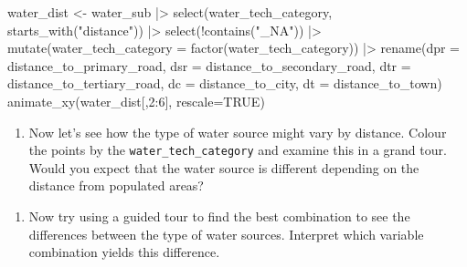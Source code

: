 \documentclass[
  letterpaper,
]{krantz}
\newenvironment{Shaded}{\begin{snugshade}}{\end{snugshade}}
\newcommand{\AttributeTok}[1]{\textcolor[rgb]{0.40,0.45,0.13}{#1}}
\newcommand{\ConstantTok}[1]{\textcolor[rgb]{0.56,0.35,0.01}{#1}}
\newcommand{\DecValTok}[1]{\textcolor[rgb]{0.68,0.00,0.00}{#1}}
\newcommand{\FunctionTok}[1]{\textcolor[rgb]{0.28,0.35,0.67}{#1}}
\newcommand{\NormalTok}[1]{\textcolor[rgb]{0.00,0.23,0.31}{#1}}
\newcommand{\OtherTok}[1]{\textcolor[rgb]{0.00,0.23,0.31}{#1}}
\newcommand{\SpecialCharTok}[1]{\textcolor[rgb]{0.37,0.37,0.37}{#1}}
\newcommand{\StringTok}[1]{\textcolor[rgb]{0.13,0.47,0.30}{#1}}
\providecommand{\tightlist}{%
  \setlength{\itemsep}{0pt}\setlength{\parskip}{0pt}}\usepackage{longtable,booktabs,array}
\begin{document}
\begin{Shaded}
\begin{Highlighting}[]
\NormalTok{water\_dist }\OtherTok{\textless{}{-}}\NormalTok{ water\_sub }\SpecialCharTok{|\textgreater{}}
  \FunctionTok{select}\NormalTok{(water\_tech\_category, }\FunctionTok{starts\_with}\NormalTok{(}\StringTok{"distance"}\NormalTok{)) }\SpecialCharTok{|\textgreater{}}
  \FunctionTok{select}\NormalTok{(}\SpecialCharTok{!}\FunctionTok{contains}\NormalTok{(}\StringTok{"\_NA"}\NormalTok{)) }\SpecialCharTok{|\textgreater{}}
  \FunctionTok{mutate}\NormalTok{(}\AttributeTok{water\_tech\_category =} \FunctionTok{factor}\NormalTok{(water\_tech\_category)) }\SpecialCharTok{|\textgreater{}}
  \FunctionTok{rename}\NormalTok{(}\AttributeTok{dpr =}\NormalTok{ distance\_to\_primary\_road,}
         \AttributeTok{dsr =}\NormalTok{ distance\_to\_secondary\_road,}
         \AttributeTok{dtr =}\NormalTok{ distance\_to\_tertiary\_road,}
         \AttributeTok{dc =}\NormalTok{ distance\_to\_city,}
         \AttributeTok{dt =}\NormalTok{ distance\_to\_town)}
\FunctionTok{animate\_xy}\NormalTok{(water\_dist[,}\DecValTok{2}\SpecialCharTok{:}\DecValTok{6}\NormalTok{], }\AttributeTok{rescale=}\ConstantTok{TRUE}\NormalTok{)}
\end{Highlighting}
\end{Shaded}

\begin{enumerate}
\def\labelenumi{\arabic{enumi}.}
\setcounter{enumi}{2}
\tightlist
\item
  Now let's see how the type of water source might vary by distance.
  Colour the points by the \texttt{water\_tech\_category} and examine
  this in a grand tour. Would you expect that the water source is
  different depending on the distance from populated areas?
\end{enumerate}

\begin{Shaded}
\end{Shaded}

\begin{enumerate}
\def\labelenumi{\arabic{enumi}.}
\setcounter{enumi}{3}
\tightlist
\item
  Now try using a guided tour to find the best combination to see the
  differences between the type of water sources. Interpret which
  variable combination yields this difference.
\end{enumerate}
\end{document}
